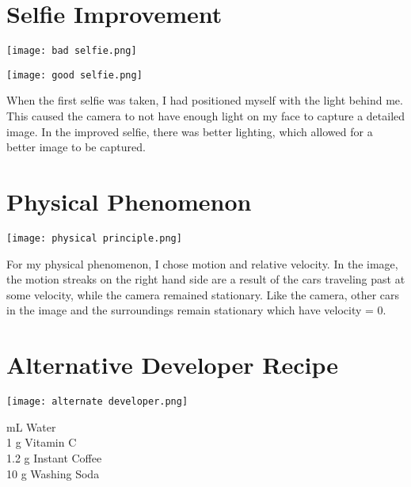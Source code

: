 \documentclass[12pt]{article}
\begin{document}

\newpage
\section*{Selfie Improvement}
    \begin{minipage}{.5\textwidth}
      \centering
      \texttt{[image: bad selfie.png]}
      \label{fig:test1}
      \vspace{5mm}
    \end{minipage}%
    \begin{minipage}{.5\textwidth}
      \centering
      \texttt{[image: good selfie.png]}
      \label{fig:test2}
      \vspace{5mm}
    \end{minipage}
    
    When the first selfie was taken, I had positioned myself with the light behind me. This caused the camera to not have enough light on my face to capture a detailed image. In the improved selfie, there was better lighting, which allowed for a better image to be captured.
\section*{Physical Phenomenon}
\begin{center}
\texttt{[image: physical principle.png]}
\end{center}
  For my physical phenomenon, I chose motion and relative velocity. In the image, the motion streaks on the right hand side are a result of the cars traveling past at some velocity, while the camera remained stationary. Like the camera, other cars in the image and the surroundings remain stationary which have velocity = 0.
\section*{Alternative Developer Recipe}
\begin{center}
    \texttt{[image: alternate developer.png]}
    \end{center}
 mL Water\\
1 g Vitamin C\\
1.2 g Instant Coffee\\
10 g Washing Soda\\
\end{document}
